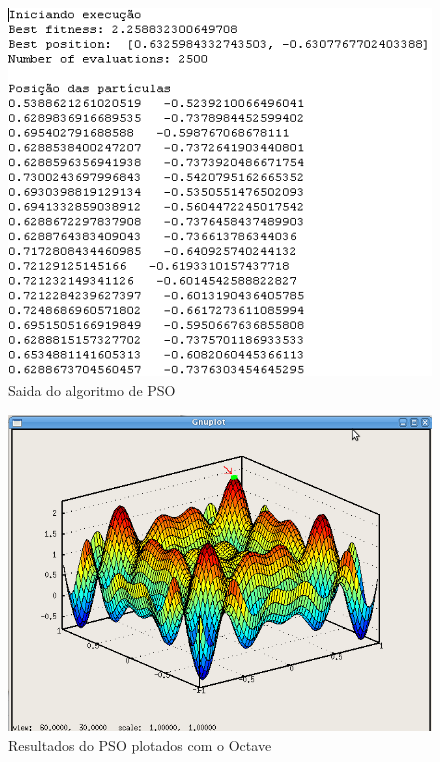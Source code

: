 \documentclass{acm_proc_article-sp}
\begin{document}
\begin{figure}[ht]
 \begin{center}
  \includegraphics[scale=0.5]{imagens/pso-saida.png}
  \caption{Saida do algoritmo de PSO}
  \label{fig:pso-saida}
 \end{center}
\end{figure}

\begin{figure}[ht]
 \begin{center}
  \includegraphics[scale=0.35]{imagens/pso-grafico.png}
  \caption{Resultados do PSO plotados com o Octave}
  \label{fig:pso-grafico}
 \end{center}
\end{figure}
\end{document}
